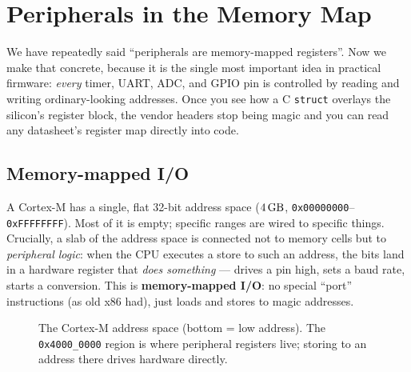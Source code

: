 \documentclass[11pt,a4paper,oneside]{book}
\newcommand{\code}[1]{\texttt{#1}}
\begin{document}
\chapter{Peripherals in the Memory Map}
\label{ch:memory-map}

We have repeatedly said ``peripherals are memory-mapped registers''. Now we make
that concrete, because it is the single most important idea in practical
firmware: \emph{every} timer, UART, ADC, and GPIO pin is controlled by reading
and writing ordinary-looking addresses. Once you see how a C \code{struct}
overlays the silicon's register block, the vendor headers stop being magic and
you can read any datasheet's register map directly into code.

\section{Memory-mapped I/O}
A Cortex-M has a single, flat 32-bit address space ($\qty{4}{\giga\byte}$,
\code{0x00000000}--\code{0xFFFFFFFF}). Most of it is empty; specific ranges are
wired to specific things. Crucially, a slab of the address space is connected
not to memory cells but to \emph{peripheral logic}: when the CPU executes a
store to such an address, the bits land in a hardware register that \emph{does
something} --- drives a pin high, sets a baud rate, starts a conversion. This is
\textbf{memory-mapped I/O}: no special ``port'' instructions (as old x86 had),
just loads and stores to magic addresses.

\begin{figure}[h]
\centering
{}
\caption{The Cortex-M address space (bottom = low address). The
\code{0x4000\_0000} region is where peripheral registers live; storing to an
address there drives hardware directly.}
\label{fig:cm-map}
\end{figure}
\end{document}

